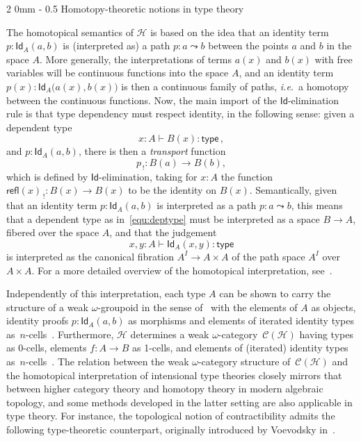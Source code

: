 \documentclass[reqno,10pt,a4paper,oneside]{amsart}
\makeatletter
\newcommand{\type}{\mathsf{type}}
\newcommand{\Id}{\mathsf{Id}}
\newcommand{\id}[1]{\Id_{#1}}
\newcommand{\refl}{\mathsf{refl}}
\newcommand{\Hint}{\mathcal{H}}
\renewcommand{\subsection}{\@startsection
  {subsection}%
  {2}%
  {0mm}%
  {-\baselineskip}%
  {0.5\baselineskip}%
  {\normalfont\normalsize\bf}}%
\numberwithin{equation}{section}
\theoremstyle{mythm}
\theoremstyle{mydef}
\theoremstyle{myrmk}
\makeatother
\begin{document}
\subsection{Homotopy-theoretic notions in type theory} 

\noindent The homotopical semantics of  $\Hint$ is based on the idea that an identity term~$p:  \id{A}(a,b)$ 
is (interpreted as) a path $p: a\leadsto b$ between the points $a$ and $b$ in the space $A$.   
More generally, the interpretations of terms $a(x)$ and $b(x)$ with free variables will be continuous 
functions into the 
space $A$, and an identity term $p(x) :  \id{A}\big(a(x),b(x)\big)$ is then a 
continuous family of paths, \emph{i.e.}~a homotopy between the continuous functions. Now, the main import of the 
$\Id$-elimination rule is that  type dependency must respect identity, in the following sense: given a dependent type
\begin{equation}
\label{equ:deptype}
x:A \vdash B(x) : \type \, ,
\end{equation} 
and $p: \id{A}(a,b)$, there is then a \emph{transport} function 
 $$p_{\, ! } : B(a) \rightarrow B(b),$$ which is defined by $\Id$-elimination, taking for $x : A$
the function $\refl(x)_{\, !} : B(x) \rightarrow B(x)$ to be the identity on $B(x)$.  Semantically, 
given that an identity term $p: \id{A}(a,b)$ is interpreted as a path $p: a\leadsto b$, 
 this means that a dependent type as in~\eqref{equ:deptype} must be interpreted as a space $B\rightarrow A$, fibered
 over the space $A$,  and that the judgement
  \[
  x,y:A \vdash\id{A}(x,y) : \type
  \] 
  is interpreted as the canonical fibration $A^I \rightarrow A\times A$ 
 of the path space $A^I$ over $A \times A$. For a more detailed overview of the homotopical interpretation, 
 see~\cite{AwodeyS:typth}.

Independently of this interpretation, each type $A$ can be shown to carry the structure of a weak 
$\omega$-groupoid in the sense of~\cite{BataninM:mongcn,LeinsterT:higohc} with the elements of $A$ as objects, identity proofs $p : \id{A}(a,b)$ as morphisms and 
 elements of iterated identity types 
 as~$n$-cells~\cite{vandenBergB:typwg,LumsdaineP:weaci}. Furthermore, $\Hint$ 
 determines a weak $\omega$-category~$\mathcal{C}(\Hint)$ having types as 0-cells, elements $f : A \rightarrow B$ as 1-cells, and elements of (iterated) identity types 
as~$n$-cells~\cite{Lumsdaine:higcft}.   The relation between the weak $\omega$-category structure of~$\mathcal{C}(\Hint)$ and the homotopical interpretation of intensional type theories closely mirrors that between higher category theory and homotopy theory in modern algebraic topology, and some methods developed in the latter setting are also applicable in type theory.  For instance,
 the topological notion of contractibility admits the following type-theoretic counterpart, originally
 introduced by Voevodsky in~\cite{VoevodskyV:unifc}.
\end{document}
